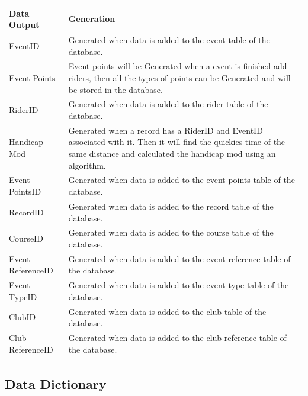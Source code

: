\begin{tabular}{l | p{10cm}}
Data Output & Generation \\ \hline
EventID & Generated when data is added to the event table of the database. \\
Event Points & Event points will be Generated when a event is finished add riders, then all the types of points can be Generated and will be stored in the database. \\
RiderID & Generated when data is added to the rider table of the database.\\
Handicap Mod & Generated when a record has a RiderID and EventID associated with it. Then it will find the quickies time of the same distance and calculated the handicap mod using an algorithm.  \\
Event PointsID & Generated when data is added to the event points table of the database. \\
RecordID & Generated when data is added to the record table of the database. \\
CourseID & Generated when data is added to the course table of the database.\\
Event ReferenceID & Generated when data is added to the event reference table of the database.\\
Event TypeID & Generated when data is added to the event type table of the database. \\
ClubID & Generated when data is added to the club table of the database. \\
Club ReferenceID & Generated when data is added to the club reference table of the database. \\
\end{tabular}

\subsection{Data Dictionary}

